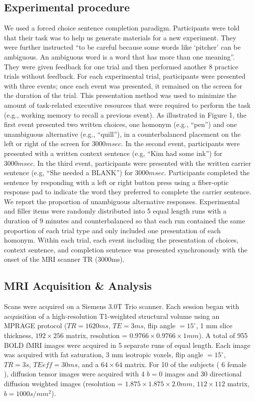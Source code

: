 \documentclass[final,authoryear,5p,times,twocolumn]{elsarticle}
\begin{document}
\subsection{Experimental procedure}
We used a forced choice sentence completion paradigm.  Participants were told that their task was to help us generate materials for a new experiment.  They were further instructed “to be careful because some words like ‘pitcher’ can be ambiguous.  An ambiguous word is a word that has more than one meaning”.  They were given feedback for one trial and then performed another 8 practice trials without feedback. For each experimental trial, participants were presented with three events; once each event was presented, it remained on the screen for the duration of the trial.  This presentation method was used to minimize the amount of task-related executive resources that were required to perform the task (e.g., working memory to recall a previous event).  As illustrated in Figure 1, the first event presented two written choices, one homonym (e.g., “pen”) and one unambiguous alternative (e.g., “quill”), in a counterbalanced placement on the left or right of the screen for $3000 msec$.  In the second event, participants were presented with a written context sentence (e.g, “Kim had some ink”) for $3000 msec$.  In the third event, participants were presented with the written carrier sentence (e.g, “She needed a BLANK”) for $3000 msec$.  Participants completed the sentence by responding with a left or right button press using a fiber-optic response pad to indicate the word they preferred to complete the carrier sentence.  We report the proportion of unambiguous alternative responses. Experimental and filler items were randomly distributed into 5 equal length runs with a duration of 9 minutes and counterbalanced so that each run contained the same proportion of each trial type and only included one presentation of each homonym.  Within each trial, each event including the presentation of choices, context sentence, and completion sentence was presented synchronously with the onset of the MRI scanner TR (3000ms).

\subsection{MRI Acquisition \& Analysis}
Scans were acquired on a Siemens 3.0T Trio scanner.  Each session began with acquisition of a high-resolution T1-weighted structural volume using an MPRAGE protocol ($TR=1620 ms$, $TE=3 ms$, flip angle $=15^{\circ}$, 1 mm slice thickness, $192 \times 256$ matrix, resolution = $0.9766 \times 0.9766 \times 1 mm$).  A total of 955 BOLD fMRI images were acquired in 5 separate runs of equal length.  Each image was acquired with fat saturation, 3 mm isotropic voxels, flip angle $=15^{\circ}$, $TR = 3 s$, $TEeff = 30 ms$, and a $64 \times 64$ matrix. For 10 of the subjects ( 6 female ), diffusion tensor images were acquired with 4 $b=0$ images and 30 directional diffusion weighted images (resolution = $1.875 \times 1.875 \times 2.0 mm$, $112 \times 112$ matrix, $b=1000 s/mm^2$). 
\end{document}
